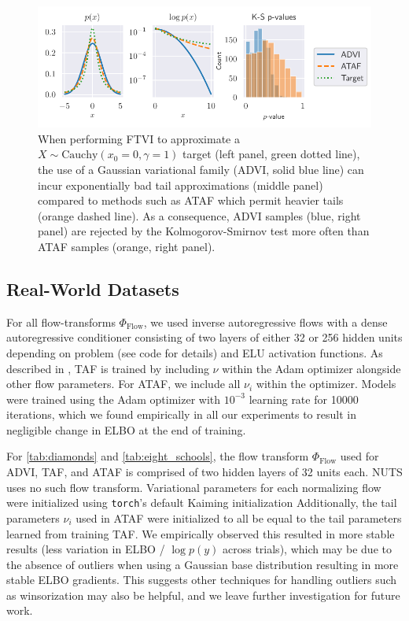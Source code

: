 \documentclass[../../thesis.tex]{subfiles}
\begin{document}
\begin{figure}[htbp]
  \centering
  \includegraphics{ftvi/Figures/fat_tail_ks.pdf}
  \caption{
    When performing FTVI to approximate a $X \sim \text{Cauchy}(x_0 = 0, \gamma = 1)$ target (left panel, green dotted line),
    the use of a Gaussian variational family (ADVI, solid blue line) can incur
    exponentially bad tail approximations (middle panel) compared to
    methods such as ATAF which permit heavier tails (orange dashed line).
    As a consequence, ADVI samples (blue, right panel) are rejected by
    the Kolmogorov-Smirnov test more often than ATAF samples (orange, right panel).
  }
  \label{fig:cauchy_normal_student}
\end{figure}

\subsection{Real-World Datasets}

For all flow-transforms $\Phi_{\text{Flow}}$, we used inverse autoregressive flows \citep{kingma2016improved} with a
dense autoregressive conditioner consisting of two layers of either 32 or 256 hidden units depending on problem (see code for details) and
ELU activation functions.
As described in \citet{jaini2020tails}, TAF is trained by including $\nu$ within the Adam optimizer alongside other flow parameters. For ATAF, we include all $\nu_i$ within the optimizer.
Models were trained using the Adam optimizer with $10^{-3}$ learning rate
for 10000 iterations, which we found empirically in all our experiments to result in negligible change in ELBO
at the end of training.

For \cref{tab:diamonds} and \cref{tab:eight_schools}, the flow transform $\Phi_{\text{Flow}}$ used for ADVI, TAF, and ATAF
is comprised of two hidden layers of 32 units each. NUTS uses no such flow transform. Variational parameters for each normalizing flow were initialized
using \texttt{torch}'s default Kaiming initialization \citep{he2015delving} Additionally, the tail parameters $\nu_i$
used in ATAF were initialized to all be equal to the tail parameters learned from training TAF. We empirically observed
this resulted in more stable results (less variation in ELBO / $\log p(y)$ across trials), which may be due to
the absence of outliers when using a Gaussian base distribution resulting in more stable ELBO gradients. This suggests
other techniques for handling outliers such as winsorization may also be helpful, and we leave further investigation
for future work.
\end{document}
